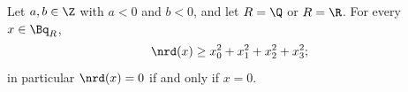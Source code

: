 Let $a,b\in\Z$ with $a<0$ and $b<0$, and let $R=\Q$ or $R=\R$. For every $x\in\Bq_R$,
\[
  \nrd(x)\ge x_0^2+x_1^2+x_2^2+x_3^2;
\]
in particular $\nrd(x)=0$ if and only if $x=0$.
